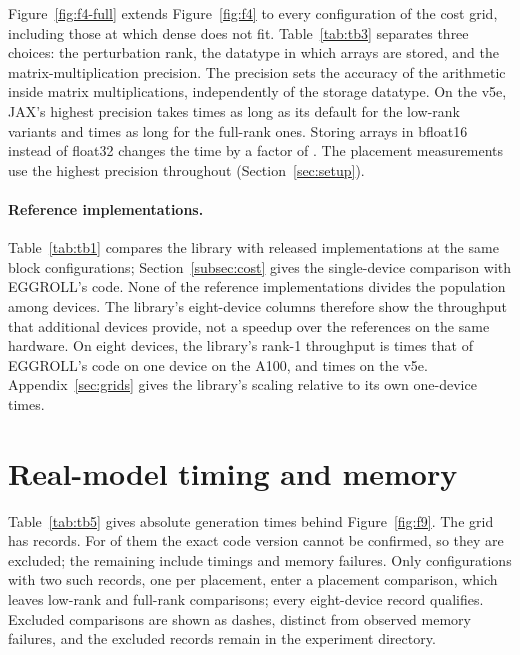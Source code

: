 

Figure~\ref{fig:f4-full} extends Figure~\ref{fig:f4} to every configuration of the cost
grid, including those at which dense does not fit. Table~\ref{tab:tb3} separates three
choices: the perturbation rank, the datatype in which arrays are stored, and the
matrix-multiplication precision. The precision sets the accuracy of the arithmetic inside
matrix multiplications, independently of the storage datatype. On the v5e, JAX's highest
precision takes \PrecisionLowRank{} times as long as its default for the low-rank variants
and \PrecisionFullRank{} times as long for the full-rank ones. Storing arrays in bfloat16
instead of float32 changes the time by a factor of \DtypeRange. The placement measurements
use the highest precision throughout (Section~\ref{sec:setup}).



\paragraph{Reference implementations.} Table~\ref{tab:tb1} compares the library with released
implementations at the same block configurations; Section~\ref{subsec:cost} gives the
single-device comparison with EGGROLL's code. None of the reference implementations divides
the population among devices. The library's eight-device columns therefore show the
throughput that additional devices provide, not a speedup over the references on the same
hardware. On eight devices, the library's rank-1 throughput is \RefEightGPU{} times that of
EGGROLL's code on one device on the A100, and \RefEightTPU{} times on the v5e.
Appendix~\ref{sec:grids} gives the library's scaling relative to its own one-device times.

\section{Real-model timing and memory}
\label{sec:memory}



Table~\ref{tab:tb5} gives absolute generation times behind Figure~\ref{fig:f9}.
The grid has \QwenRecords{} records. For \QwenUnknownRecords{} of them the exact code version
cannot be confirmed, so they are excluded; the remaining \QwenKnownRecords{} include
\QwenKnownTimings{} timings and \QwenKnownOOM{} memory failures. Only configurations with two
such records, one per placement, enter a placement comparison, which leaves
\QwenLowComparisons{} low-rank and \QwenFullComparisons{} full-rank comparisons; every
eight-device record qualifies. Excluded comparisons are shown as dashes, distinct from observed
memory failures, and the excluded records remain in the experiment directory.

